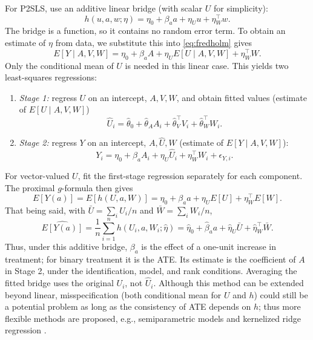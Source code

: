 \documentclass[11pt,twoside]{article}
\begin{document}
\begin{enumerate}
    For P2SLS, use an additive linear bridge (with scalar $U$ for simplicity):
    \[
    h(u,a,w;\eta)=\eta_0+\beta_a a+\eta_Uu+\eta_W^\top w.
    \]
    The bridge is a function, so it contains no random error term. To obtain an estimate of $\eta$ from data, we substitute this into \eqref{eq:fredholm} gives
    \[
    E[Y\mid A,V,W]
    =\eta_0+\beta_a A+\eta_U E[U\mid A,V,W]+\eta_W^\top W.
    \]
    Only the conditional mean of $U$ is needed in this linear case. This yields two least-squares regressions:
    \begin{enumerate}
        \item \emph{Stage 1:} regress $U$ on an intercept, $A,V,W$, and obtain fitted values (estimate of $E[U\mid A,V,W]$)
        \[
        \widehat U_i
        =\widehat\theta_0+\widehat\theta_A A_i
         +\widehat\theta_V^\top V_i+\widehat\theta_W^\top W_i.
        \]
        \item \emph{Stage 2:} regress $Y$ on an intercept, $A,\widehat U,W$ (estimate of $E[Y\mid A,V,W]$):
        \[
        Y_i=\eta_0+\beta_a A_i+\eta_U\widehat U_i
            +\eta_W^\top W_i+\epsilon_{Y,i}.
        \]
    \end{enumerate}
    For vector-valued $U$, fit the first-stage regression separately for each component. The proximal $g$-formula then gives
    \[
    E[Y(a)]=E[h(U,a,W)]=\eta_0+\beta_a a+\eta_U E[U]+\eta_W^\top E[W].
    \]
    That being said, with $\bar U = \sum_i U_i/n$ and $\bar W = \sum_i W_i/n$,
    \[
    \widehat{E[Y(a)]}
    =\frac1n\sum_{i=1}^n h(U_i,a,W_i;\widehat\eta)
    =\widehat\eta_0+\widehat\beta_a a
    +\widehat\eta_U\bar U+\widehat\eta_W^\top\bar W.
    \]
    Thus, under this additive bridge, $\beta_a$ is the effect of a one-unit increase in treatment; for binary treatment it is the ATE. Its estimate is the coefficient of $A$ in Stage 2, under the identification, model, and rank conditions. Averaging the fitted bridge uses the original $U_i$, not $\widehat U_i$. Although this method can be extended beyond linear, misspecification (both conditional mean for $U$ and $h$) could still be a potential problem as long as the consistency of ATE depends on $h$; thus more flexible methods are proposed, e.g., semiparametric models \cite{cui2024semiparametric} and kernelized ridge  regression \cite{mastouri2021proximal}.



\end{enumerate}
\end{document}
